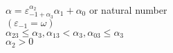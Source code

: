 \documentclass{article}
\begin{document}
$\alpha=\varepsilon_{-1+\alpha_3}^{\alpha_2}\alpha_1+\alpha_0$ or natural number\\
$(\varepsilon_{-1}=\omega)$\\
$\alpha_{23}\leq\alpha_3, \alpha_{13}<\alpha_{3}, \alpha_{03}\leq\alpha_3$\\
$\alpha_2>0$\\
\end{document}

